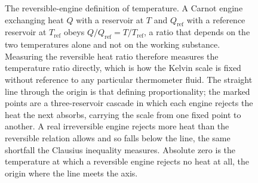 \begin{figure}[htbp]
\centering
{}
\caption[The thermodynamic (Kelvin) temperature scale]{The reversible-engine
definition of temperature. A Carnot engine exchanging heat $Q$ with a reservoir at
$T$ and $Q_{\mathrm{ref}}$ with a reference reservoir at $T_{\mathrm{ref}}$ obeys
$Q/Q_{\mathrm{ref}} = T/T_{\mathrm{ref}}$, a ratio that depends on the two
temperatures alone and not on the working substance. Measuring the reversible heat
ratio therefore measures the temperature ratio directly, which is how the Kelvin
scale is fixed without reference to any particular thermometer fluid. The straight
line through the origin is that defining proportionality; the marked points are a
three-reservoir cascade in which each engine rejects the heat the next absorbs,
carrying the scale from one fixed point to another. A real irreversible engine
rejects more heat than the reversible relation allows and so falls below the line,
the same shortfall the Clausius inequality measures. Absolute zero is the
temperature at which a reversible engine rejects no heat at all, the origin where
the line meets the axis.}
\label{fig:vol04ch04:kelvin-scale}
\end{figure}
